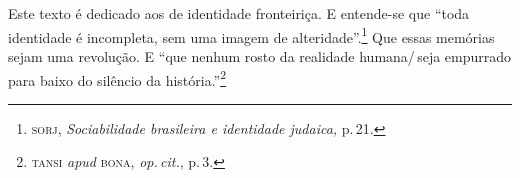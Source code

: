 \chapter*{}
\thispagestyle{empty}

\vfill

\begin{flushright}
{\small
Este texto é dedicado aos de identidade fronteiriça. E entende-se que ``toda identidade é incompleta, sem uma imagem de alteridade''.\footnote{\textsc{sorj}, \emph{Sociabilidade brasileira e identidade judaica,} p.\,21.} Que essas memórias sejam uma revolução. E ``que nenhum rosto da realidade humana/\,seja empurrado para baixo do silêncio da história.''\footnote{\textsc{tansi} \emph{apud} \textsc{bona}, \emph{op.\,cit.}, p.\,3.}}
\end{flushright}

\vfill

\pagebreak
